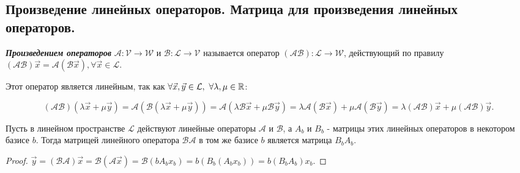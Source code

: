 \subsection{
    Произведение линейных операторов. Матрица для произведения линейных операторов.
}

\begin{definition}
    \textbf{\textit{Произведением операторов}} $\mathscr{A} \colon \mathcal{V} \to \mathcal{W}$ и $\mathscr{B} \colon \mathcal{L} \to \mathcal{V}$ называется оператор $(\mathscr{A}\mathscr{B}) \colon \mathcal{L} \to \mathcal{W}$, действующий по правилу $(\mathscr{A}\mathscr{B})\vec{x} = \mathscr{A}(\mathscr{B}\vec{x}), \forall \vec{x} \in \mathcal{L}$. 
    
    Этот оператор является линейным, так как $\forall \vec{x}, \vec{y} \in \mathcal{L},\thinspace \thinspace \forall \lambda, \mu \in \mathbb{R}$:

    $$(\mathscr{A}\mathscr{B})(\lambda\vec{x} + \mu\vec{y}) = \mathscr{A}(\mathscr{B}(\lambda\vec{x} + \mu\vec{y})) = \mathscr{A}(\lambda\mathscr{B}\vec{x} + \mu\mathscr{B}\vec{y}) = \lambda\mathscr{A}(\mathscr{B}\vec{x}) + \mu\mathscr{A}(\mathscr{B}\vec{y}) = \lambda(\mathscr{A}\mathscr{B})\vec{x} + \mu(\mathscr{A}\mathscr{B})\vec{y}.$$
\end{definition}

\begin{theorem}
    Пусть в линейном пространстве $\mathcal{L}$ действуют линейные операторы $\mathscr{A}$ и $\mathscr{B}$, а $A_b$ и $B_b$ - матрицы этих линейных операторов в некотором базисе $b$. Тогда матрицей линейного оператора $\mathscr{B}\mathscr{A}$ в том же базисе $b$ является матрица $B_bA_b$.
\end{theorem}

\begin{proof}
    $\vec{y} = (\mathscr{B}\mathscr{A})\vec{x} = \mathscr{B}(\mathscr{A}\vec{x}) = \mathscr{B}(bA_bx_b) = b(B_b(A_bx_b)) = b(B_bA_b)x_b.$
\end{proof}
